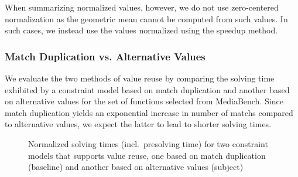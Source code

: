 When summarizing normalized values, however, we do not use \gls{zero-centered
  normalization} as the geometric mean cannot be computed from such values.
%
In such cases, we instead use the values normalized using the \gls{speedup}
method.


\subsubsection{Match Duplication vs. Alternative Values}

We evaluate the two methods of \gls{value reuse} by comparing the solving time
exhibited by a \gls{constraint model} based on \gls{match duplication} and
another  based on \glspl{alternative value} for the
set of \glspl{function} selected from \gls{MediaBench}.
%
Since \gls{match duplication} yields an exponential increase in number of
\glspl{match} compared to \glspl{alternative value}, we expect the latter to
lead to shorter solving times.

\begin{figure}
  \centering%
  \maxsizebox{\textwidth}{!}{%
    \trimBarchartPlot{%
    }%
  }

  \caption[%
            Plot for evaluating match duplication's and alternative values'
            impact on solving time%
          ]%
          {%
            Normalized solving times (incl.\ presolving time) for two
            constraint models that supports value reuse, one based on match
            duplication (baseline) and another based on alternative values
            (subject)%
          }
\end{figure}



